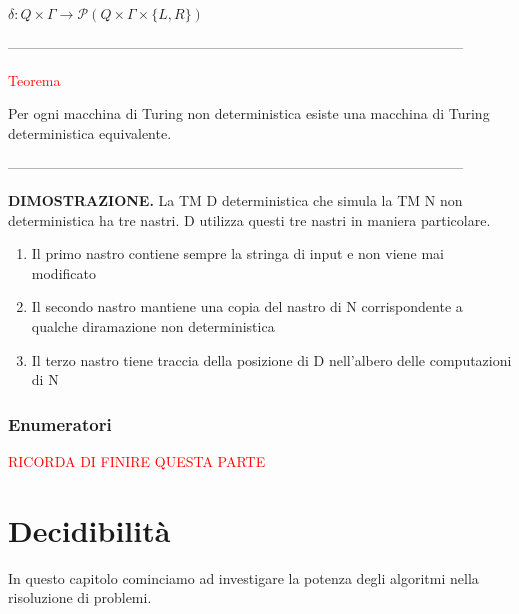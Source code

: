 \documentclass{article}
\begin{document}
\begin{center}
    $\delta: Q \times \Gamma \rightarrow \mathcal{P}(Q \times \Gamma \times \{L,
    R\})$
\end{center}

--------------------------------------------------------------------------------------------------

\begin{center}
    \textcolor{red}{Teorema}
\end{center}

Per ogni macchina di Turing non deterministica esiste una macchina di Turing
deterministica equivalente.

--------------------------------------------------------------------------------------------------

\textbf{DIMOSTRAZIONE.}  La TM D deterministica che simula la TM N non
deterministica ha tre nastri. D utilizza questi tre nastri in maniera
particolare.

\begin{enumerate}
    \item Il primo nastro contiene sempre la stringa di input e non viene mai
    modificato
    \item Il secondo nastro mantiene una copia del nastro di N corrispondente a
    qualche diramazione non deterministica
    \item Il terzo nastro tiene traccia della posizione di D nell'albero delle
    computazioni di N
\end{enumerate}

\subsubsection{Enumeratori}

\textcolor{red}{RICORDA DI FINIRE QUESTA PARTE}

\section{Decidibilità}

In questo capitolo cominciamo ad investigare la potenza degli algoritmi nella
risoluzione di problemi.
\end{document}
